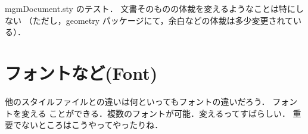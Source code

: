 \documentclass{jsarticle}
\begin{document}
\pagestyle{fancy}

\maketitle
\thispagestyle{fancy}

mgmDocument.sty のテスト．
文書そのものの体裁を変えるようなことは特にしない
（ただし，geometry パッケージにて，余白などの体裁は多少変更されている）．

\section{フォントなど(Font)}
他のスタイルファイルとの違いは何といっても{\strong フォントの違い}だろう．
フォントを{\gtfamily\ebseries 変える}
ことができる．複数のフォントが可能．{\strong 変える}ってすばらしい．
{\weak 重要でないところはこうやってやったりね}．
\end{document}
